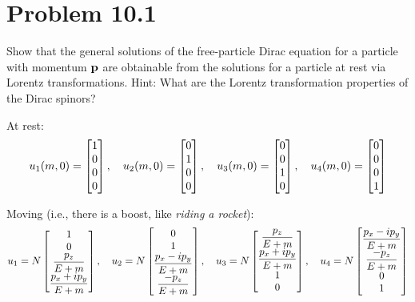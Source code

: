 \documentclass[12pt,a4paper]{article}
\begin{document}
	
	\section*{
		Problem 10.1
	}
	\begin{problem}
		Show that the general solutions of the free-particle Dirac equation for 
		a particle with momentum $\vb p$ are obtainable from the solutions for a 
		particle at rest via Lorentz transformations. Hint: What are the Lorentz 
		transformation properties of the Dirac spinors?

		At rest:
		\begin{equation}
			\label{eq:at-rest}
		    u_1(m,0) 
			=
			\bmqty{
				1\\0\\0\\0
			},\quad  
		    u_2(m,0) 
			=
			\bmqty{
				0\\1\\0\\0
			},\quad  
		    u_3(m,0) 
			=
			\bmqty{
				0\\0\\1\\0
			},\quad  
		    u_4(m,0) 
			=
			\bmqty{
				0\\0\\0\\1
			}
		\end{equation}

		Moving (i.e., there is a boost, like \textit{riding a rocket}):
		\begin{equation}
			\label{eq:moving}
		    u_1
			=
			N
			\bmqty{
				1\\0\\
				\dfrac{p_z}{E+m} 
				\\
				\dfrac{p_x + ip_y}{E+m} 
			},\quad  
		    u_2
			=
			N
			\bmqty{
				0\\1\\
				\dfrac{p_x - ip_y}{E+m} 
				\\
				\dfrac{-p_z}{E+m} 
			},\quad  
		    u_3
			=
			N
			\bmqty{
				\dfrac{p_z}{E+m} 
				\\
				\dfrac{p_x + ip_y}{E+m} 
				\\
				1\\0
			},\quad  
		    u_4
			=
			N
			\bmqty{
				\dfrac{p_x - ip_y}{E+m} 
				\\
				\dfrac{-p_z}{E+m} 
				\\
				0\\1
			}
		\end{equation}
	\end{problem}
\end{document}
